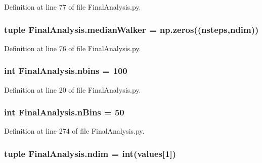 Definition at line 77 of file Final\-Analysis.\-py.

\hypertarget{namespace_final_analysis_a84eaae13a656db02c1fb234b67fa211f}{
\subsubsection[{median\-Walker}]{\setlength{\rightskip}{0pt plus 5cm}tuple Final\-Analysis.\-median\-Walker = np.\-zeros(({\bf nsteps},{\bf ndim}))}}\label{namespace_final_analysis_a84eaae13a656db02c1fb234b67fa211f}


Definition at line 76 of file Final\-Analysis.\-py.

\hypertarget{namespace_final_analysis_ab8aad06278d0423ea7c2ef145097954b}{
\subsubsection[{nbins}]{\setlength{\rightskip}{0pt plus 5cm}int Final\-Analysis.\-nbins = 100}}\label{namespace_final_analysis_ab8aad06278d0423ea7c2ef145097954b}


Definition at line 20 of file Final\-Analysis.\-py.

\hypertarget{namespace_final_analysis_afbe11458d00db6f07dc367e9d9074744}{
\subsubsection[{n\-Bins}]{\setlength{\rightskip}{0pt plus 5cm}int Final\-Analysis.\-n\-Bins = 50}}\label{namespace_final_analysis_afbe11458d00db6f07dc367e9d9074744}


Definition at line 274 of file Final\-Analysis.\-py.

\hypertarget{namespace_final_analysis_ae4b307ed4519c8b02333909f683f76d6}{
\subsubsection[{ndim}]{\setlength{\rightskip}{0pt plus 5cm}tuple Final\-Analysis.\-ndim = int({\bf values}\mbox{[}1\mbox{]})}}\label{namespace_final_analysis_ae4b307ed4519c8b02333909f683f76d6}


